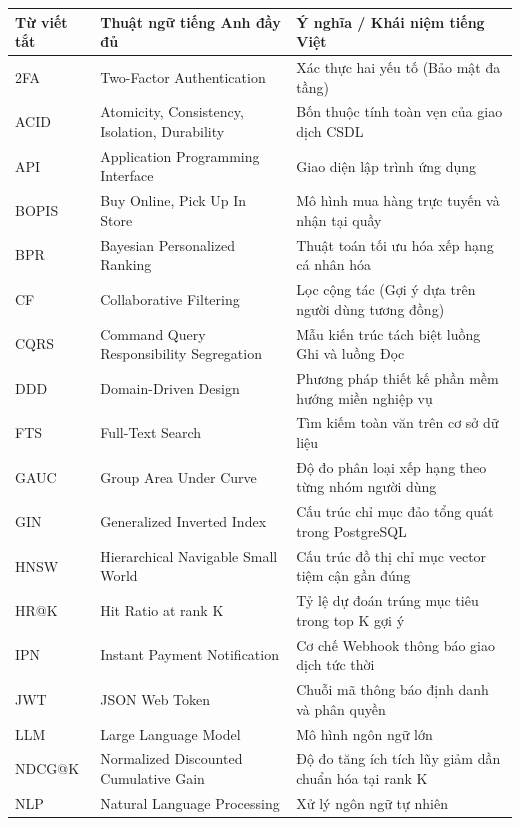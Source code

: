 \documentclass[12pt,a4paper]{report}
\begin{document}
\begin{longtable}{|p{2.5cm}|p{6cm}|p{6.5cm}|}
\hline
\rowcolor[HTML]{EFEFEF}
\textbf{Từ viết tắt} & \textbf{Thuật ngữ tiếng Anh đầy đủ} & \textbf{Ý nghĩa / Khái niệm tiếng Việt} \\ \hline
\endhead
2FA & Two-Factor Authentication & Xác thực hai yếu tố (Bảo mật đa tầng) \\ \hline
ACID & Atomicity, Consistency, Isolation, Durability & Bốn thuộc tính toàn vẹn của giao dịch CSDL \\ \hline
API & Application Programming Interface & Giao diện lập trình ứng dụng \\ \hline
BOPIS & Buy Online, Pick Up In Store & Mô hình mua hàng trực tuyến và nhận tại quầy \\ \hline
BPR & Bayesian Personalized Ranking & Thuật toán tối ưu hóa xếp hạng cá nhân hóa \\ \hline
CF & Collaborative Filtering & Lọc cộng tác (Gợi ý dựa trên người dùng tương đồng) \\ \hline
CQRS & Command Query Responsibility Segregation & Mẫu kiến trúc tách biệt luồng Ghi và luồng Đọc \\ \hline
DDD & Domain-Driven Design & Phương pháp thiết kế phần mềm hướng miền nghiệp vụ \\ \hline
FTS & Full-Text Search & Tìm kiếm toàn văn trên cơ sở dữ liệu \\ \hline
GAUC & Group Area Under Curve & Độ đo phân loại xếp hạng theo từng nhóm người dùng \\ \hline
GIN & Generalized Inverted Index & Cấu trúc chỉ mục đảo tổng quát trong PostgreSQL \\ \hline
HNSW & Hierarchical Navigable Small World & Cấu trúc đồ thị chỉ mục vector tiệm cận gần đúng \\ \hline
HR@K & Hit Ratio at rank K & Tỷ lệ dự đoán trúng mục tiêu trong top K gợi ý \\ \hline
IPN & Instant Payment Notification & Cơ chế Webhook thông báo giao dịch tức thời \\ \hline
JWT & JSON Web Token & Chuỗi mã thông báo định danh và phân quyền \\ \hline
LLM & Large Language Model & Mô hình ngôn ngữ lớn \\ \hline
NDCG@K & Normalized Discounted Cumulative Gain & Độ đo tăng ích tích lũy giảm dần chuẩn hóa tại rank K \\ \hline
NLP & Natural Language Processing & Xử lý ngôn ngữ tự nhiên \\ \hline

\end{longtable}
\end{document}
